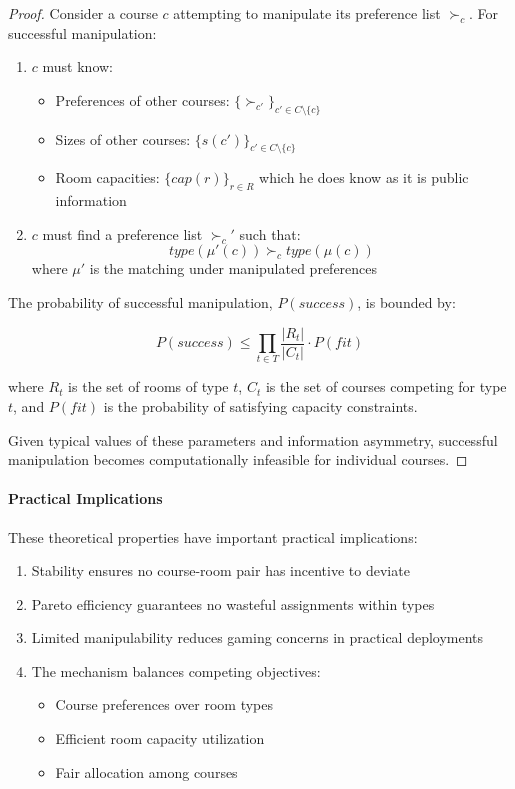\documentclass[a4paper, oneside]{article}
\theoremstyle{plain}
\begin{document}
\begin{proof}
Consider a course $c$ attempting to manipulate its preference list $\succ_c$. For successful manipulation:
\begin{enumerate}
    \item $c$ must know:
        \begin{itemize}
            \item Preferences of other courses: $\{\succ_{c'}\}_{c' \in C\setminus\{c\}}$
            \item Sizes of other courses: $\{s(c')\}_{c' \in C\setminus\{c\}}$
            \item Room capacities: $\{cap(r)\}_{r \in R}$ which he does know as it is public information
        \end{itemize}
    \item $c$ must find a preference list $\succ_c'$ such that:
        $$type(\mu'(c)) \succ_c type(\mu(c))$$
        where $\mu'$ is the matching under manipulated preferences
\end{enumerate}

The probability of successful manipulation, $P(success)$, is bounded by:

$$P(success) \leq \prod_{t \in T} \frac{|R_t|}{|C_t|} \cdot P(fit)$$

where $R_t$ is the set of rooms of type $t$, $C_t$ is the set of courses competing for type $t$, and $P(fit)$ is the probability of satisfying capacity constraints.

Given typical values of these parameters and information asymmetry, successful manipulation becomes computationally infeasible for individual courses.
\end{proof}

\paragraph{Practical Implications}

These theoretical properties have important practical implications:

\begin{enumerate}
    \item Stability ensures no course-room pair has incentive to deviate
    \item Pareto efficiency guarantees no wasteful assignments within types
    \item Limited manipulability reduces gaming concerns in practical deployments
    \item The mechanism balances competing objectives:
        \begin{itemize}
            \item Course preferences over room types
            \item Efficient room capacity utilization
            \item Fair allocation among courses
        \end{itemize}
\end{enumerate}
\end{document}
